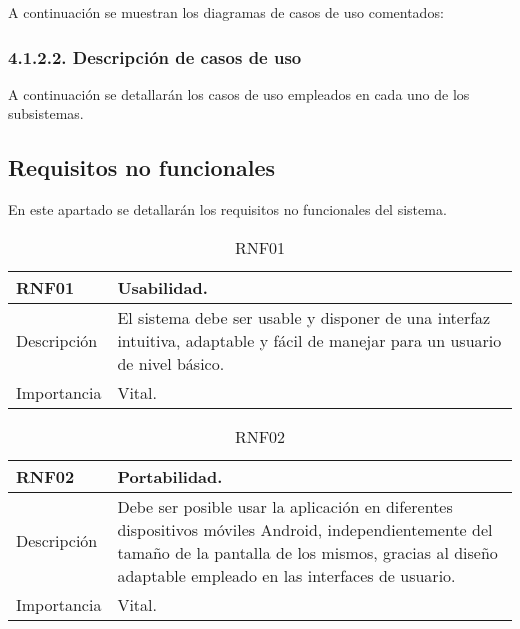 A continuación se muestran los diagramas de casos de uso comentados:






\subsubsection{4.1.2.2. Descripción de casos de uso}

A continuación se detallarán los casos de uso empleados en cada uno de los subsistemas.

\subsection{Requisitos no funcionales}

En este apartado se detallarán los requisitos no funcionales del sistema.

\begin{table}[H]
\label{RNF01}
\begin{center}
\begin{tabular}{| l | p{10cm} |}
\hline
RNF01 & Usabilidad.\\
\hline
Descripción & El sistema debe ser usable y disponer de una interfaz intuitiva, adaptable y fácil de manejar para un usuario de nivel básico.\\
\hline
Importancia & Vital.\\
\hline
\end{tabular}
\end{center}
\caption{RNF01}
\end{table} 

\begin{table}[H]
\label{RNF02}
\begin{center}
\begin{tabular}{| l | p{10cm} |}
\hline
RNF02 & Portabilidad.\\
\hline
Descripción & Debe ser posible usar la aplicación en diferentes dispositivos móviles Android, independientemente del tamaño de la pantalla de los mismos, gracias al diseño adaptable empleado en las interfaces de usuario.\\
\hline
Importancia & Vital.\\
\hline
\end{tabular}
\end{center}
\caption{RNF02}
\end{table}

